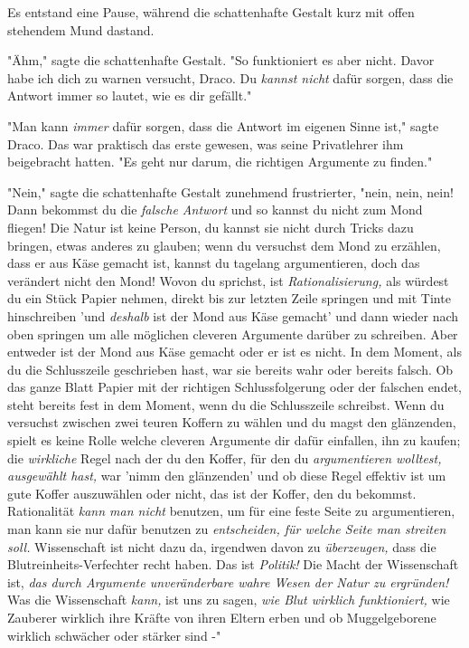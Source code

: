 {Es entstand eine Pause, während die schattenhafte Gestalt kurz mit offen stehendem Mund dastand.

"Ähm," sagte die schattenhafte Gestalt. "So funktioniert es aber nicht. Davor habe ich dich zu warnen versucht, Draco. Du \emph{kannst nicht} dafür sorgen, dass die Antwort immer so lautet, wie es dir gefällt."

"Man kann \emph{immer} dafür sorgen, dass die Antwort im eigenen Sinne ist," sagte Draco. Das war praktisch das erste gewesen, was seine Privatlehrer ihm beigebracht hatten. "Es geht nur darum, die richtigen Argumente zu finden."

"Nein," sagte die schattenhafte Gestalt zunehmend frustrierter, "nein, nein, nein! Dann bekommst du die \emph{falsche Antwort} und so kannst du nicht zum Mond fliegen! Die Natur ist keine Person, du kannst sie nicht durch Tricks dazu bringen, etwas anderes zu glauben; wenn du versuchst dem Mond zu erzählen, dass er aus Käse gemacht ist, kannst du tagelang argumentieren, doch das verändert nicht den Mond! Wovon du sprichst, ist \emph{Rationalisierung,} als würdest du ein Stück Papier nehmen, direkt bis zur letzten Zeile springen und mit Tinte hinschreiben 'und \emph{deshalb} ist der Mond aus Käse gemacht' und dann wieder nach oben springen um alle möglichen cleveren Argumente darüber zu schreiben. Aber entweder ist der Mond aus Käse gemacht oder er ist es nicht. In dem Moment, als du die Schlusszeile geschrieben hast, war sie bereits wahr oder bereits falsch. Ob das ganze Blatt Papier mit der richtigen Schlussfolgerung oder der falschen endet, steht bereits fest in dem Moment, wenn du die Schlusszeile schreibst. Wenn du versuchst zwischen zwei teuren Koffern zu wählen und du magst den glänzenden, spielt es keine Rolle welche cleveren Argumente dir dafür einfallen, ihn zu kaufen; die \emph{wirkliche} Regel nach der du den Koffer, für den du \emph{argumentieren wolltest, ausgewählt hast,} war 'nimm den glänzenden' und ob diese Regel effektiv ist um gute Koffer auszuwählen oder nicht, das ist der Koffer, den du bekommst. Rationalität \emph{kann man nicht} benutzen, um für eine feste Seite zu argumentieren, man kann sie nur dafür benutzen zu \emph{entscheiden, für welche Seite man streiten soll.} Wissenschaft ist nicht dazu da, irgendwen davon zu \emph{überzeugen,} dass die Blutreinheits-Verfechter recht haben. Das ist \emph{Politik!} Die Macht der Wissenschaft ist, \emph{das durch Argumente unveränderbare wahre Wesen der Natur zu ergründen!} Was die Wissenschaft \emph{kann,} ist uns zu sagen, \emph{wie Blut wirklich funktioniert,} wie Zauberer wirklich ihre Kräfte von ihren Eltern erben und ob Muggelgeborene wirklich schwächer oder stärker sind -"

}
